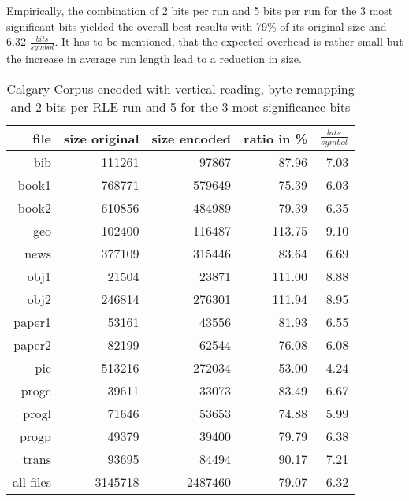 \par{
Empirically, the combination of 2 bits per run and 5 bits per run for the 3 most significant bits yielded the overall best results with 79\% of its original size and 6.32 $\frac{bits}{symbol}$. It has to be mentioned, that the expected overhead is rather small but the increase in average run length lead to a reduction in size.

\begin{table}[H]
	\centering
	\begin{tabular}{r|r|r|r|r}	
		file & size original & size encoded & ratio in \% & $\frac{bits}{symbol}$\\
		\hline
		bib & 111261 & 97867 & 87.96 & 7.03\\
		book1 & 768771 & 579649 & 75.39 & 6.03 \\
		book2 & 610856 & 484989 & 79.39 & 6.35\\
		geo & 102400 & 116487 & 113.75 & 9.10\\
		news & 377109 & 315446 & 83.64 & 6.69\\
		obj1 & 21504 & 23871 & 111.00 & 8.88\\
		obj2& 246814 & 276301 & 111.94 & 8.95\\		 
		paper1 & 53161 & 43556 & 81.93 & 6.55\\		 
		paper2& 82199 & 62544 & 76.08 & 6.08\\		 
		pic & 513216 & 272034 & 53.00 & 4.24\\		 
		progc & 39611 & 33073 & 83.49 & 6.67\\		 
		progl & 71646 & 53653 & 74.88 & 5.99\\		 
		progp & 49379 & 39400 & 79.79 & 6.38\\		 
		trans & 93695 & 84494 & 90.17 & 7.21\\
		\hline
		all files & 3145718 & 2487460 & 79.07 & 6.32
	\end{tabular}
	\caption{Calgary Corpus encoded with vertical reading, byte remapping and 2 bits per RLE run and 5 for the 3 most significance bits}
\label{tab:t43 Calgary Corpus encoded with vertical reading, byte remapping and 2 bits per RLE run and 5 for the 3 most significance bits}
\end{table}
}


